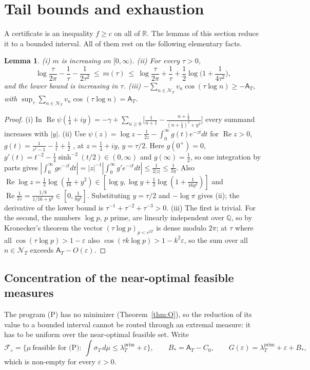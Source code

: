 \documentclass[11pt]{amsart}
\newtheorem{lemma}[theorem]{Lemma}
\theoremstyle{definition}
\theoremstyle{remark}
\newcommand{\R}{\mathbb R}
\newcommand{\Q}{\mathbb Q}
\newcommand{\Rel}{\operatorname{Re}}
\newcommand{\lamP}{\lambda^{\mathrm{prim}}_T}
\newcommand{\sT}{\sigma_T}
\newcommand{\NT}{\mathcal N_T}
\newcommand{\Aconst}{\mathsf A_T}
\begin{document}
\section{Tail bounds and exhaustion}\label{sec:tails}

A certificate is an inequality $f\ge c$ on all of $\R$. The lemmas of this section reduce it to
a bounded interval. All of them rest on the following elementary facts.

\begin{lemma}\label{lem:mbounds}
\emph{(i)} $m$ is increasing on $[0,\infty)$. \emph{(ii)} For every $\tau>0$,
\[
\log\frac{\tau}{2\pi}-\frac1\tau-\frac1{2\tau^2}\ \le\ m(\tau)\ \le\ \log\frac{\tau}{2\pi}+\frac1\tau+\frac12\log\Big(1+\frac1{4\tau^2}\Big),
\]
and the lower bound is increasing in $\tau$. \emph{(iii)} $-\sum_{n\in\NT}v_n\cos(\tau\log n)\ge-\Aconst$, with
$\sup_\tau\sum_{n\in\NT}v_n\cos(\tau\log n)=\Aconst$.
\end{lemma}
\begin{proof}
(i) In $\Rel\psi(\frac14+iy)=-\gamma+\sum_{n\ge0}\big[\frac1{n+1}-\frac{n+\frac14}{(n+\frac14)^2+y^2}\big]$
every summand increases with $|y|$. (ii) Use $\psi(z)=\log z-\frac1{2z}-\int_0^\infty g(t)e^{-zt}dt$
for $\Rel z>0$, $g(t)=\frac1{e^t-1}-\frac1t+\frac12$ \cite[5.9.13]{DLMF}, at $z=\frac14+iy$, $y=\tau/2$.
Here $g(0^+)=0$, $g'(t)=t^{-2}-\frac14\sinh^{-2}(t/2)\in(0,\infty)$ and $g(\infty)=\frac12$, so one
integration by parts gives $|\int_0^\infty g e^{-zt}dt|=|z|^{-1}|\int_0^\infty g'e^{-zt}dt|\le\frac1{2|z|}\le\frac1{2y}$.
Also $\Rel\log z=\frac12\log(\frac1{16}+y^2)\in[\log y,\log y+\frac12\log(1+\frac1{16y^2})]$ and
$\Rel\frac1{2z}=\frac{1/8}{1/16+y^2}\in[0,\frac1{8y^2}]$. Substituting $y=\tau/2$ and $-\log\pi$
gives (ii); the derivative of the lower bound is $\tau^{-1}+\tau^{-2}+\tau^{-3}>0$. (iii) The
first is trivial. For the second, the numbers $\log p$, $p$ prime, are linearly independent over
$\Q$, so by Kronecker's theorem the vector $(\tau\log p)_{p<e^{2T}}$ is dense modulo $2\pi$; at
$\tau$ where all $\cos(\tau\log p)>1-\varepsilon$ also $\cos(\tau k\log p)>1-k^2\varepsilon$, so the
sum over all $n\in\NT$ exceeds $\Aconst-O(\varepsilon)$.
\end{proof}

\subsection{Concentration of the near-optimal feasible measures}\label{subsec:conc}

The program (P) has no minimizer (Theorem~\ref{thm:O}), so the reduction of its value to a bounded
interval cannot be routed through an extremal measure: it has to be uniform over the near-optimal
feasible set. Write
\[
\mathcal F_\varepsilon=\Big\{\mu\ \text{feasible for (P)}:\ \int\sT\,d\mu\le\lamP+\varepsilon\Big\},
\qquad B_*=\Aconst-C_0,\qquad G(\varepsilon)=\lamP+\varepsilon+B_*,
\]
which is non-empty for every $\varepsilon>0$.
\end{document}
